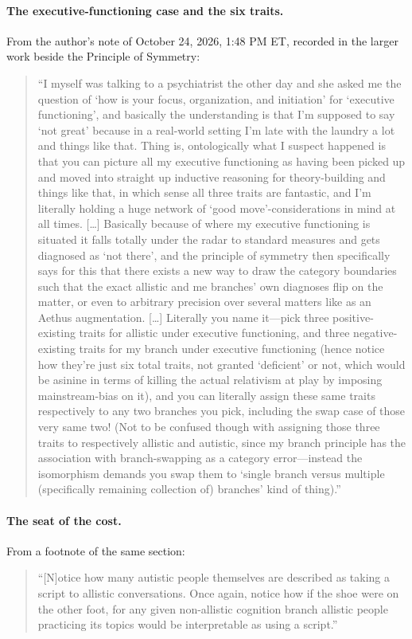 \paragraph{The executive-functioning case and the six traits.} From the author's note of October 24, 2026, 1:48 PM ET, recorded in the larger work beside the Principle of Symmetry:
\begin{quote}
``I myself was talking to a psychiatrist the other day and she asked me the question of `how is your focus, organization, and initiation' for `executive functioning', and basically the understanding is that I'm supposed to say `not great' because in a real-world setting I'm late with the laundry a lot and things like that. Thing is, ontologically what I suspect happened is that you can picture all my executive functioning as having been picked up and moved into straight up inductive reasoning for theory-building and things like that, in which sense all three traits are fantastic, and I'm literally holding a huge network of `good move'-considerations in mind at all times. [\ldots] Basically because of where my executive functioning is situated it falls totally under the radar to standard measures and gets diagnosed as `not there', and the principle of symmetry then specifically says for this that there exists a new way to draw the category boundaries such that the exact allistic and me branches' own diagnoses flip on the matter, or even to arbitrary precision over several matters like as an Aethus augmentation. [\ldots] Literally you name it---pick three positive-existing traits for allistic under executive functioning, and three negative-existing traits for my branch under executive functioning (hence notice how they're just six total traits, not granted `deficient' or not, which would be asinine in terms of killing the actual relativism at play by imposing mainstream-bias on it), and you can literally assign these same traits respectively to any two branches you pick, including the swap case of those very same two! (Not to be confused though with assigning those three traits to respectively allistic and autistic, since my branch principle has the association with branch-swapping as a category error---instead the isomorphism demands you swap them to `single branch versus multiple (specifically remaining collection of) branches' kind of thing).''
\end{quote}

\paragraph{The seat of the cost.} From a footnote of the same section:
\begin{quote}
``[N]otice how many autistic people themselves are described as taking a script to allistic conversations. Once again, notice how if the shoe were on the other foot, for any given non-allistic cognition branch allistic people practicing its topics would be interpretable as using a script.''
\end{quote}

